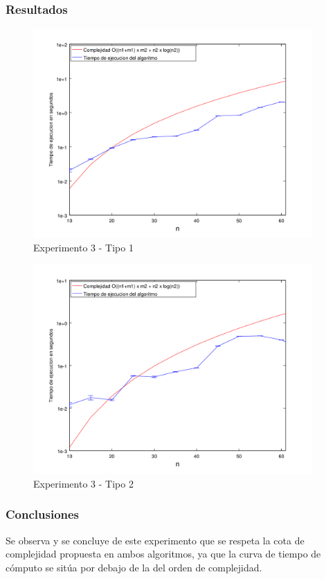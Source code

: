 \subsubsection*{Resultados}\;

    \begin{figure}[H]
      \includegraphics[height=8cm]{graficos/ejercicio5-exp3-tipo1.png}
       \caption{Experimento 3 - Tipo 1}
	\end{figure}
    
        \begin{figure}[H]
      \includegraphics[height=8cm]{graficos/ejercicio5-exp3-tipo2.png}
       \caption{Experimento 3 - Tipo 2}
	\end{figure}


\subsubsection*{Conclusiones}\;
    Se observa y se concluye de este experimento que se respeta la cota de complejidad propuesta en ambos algoritmos, ya que la curva de tiempo de cómputo se sitúa por debajo de la del orden de complejidad.

